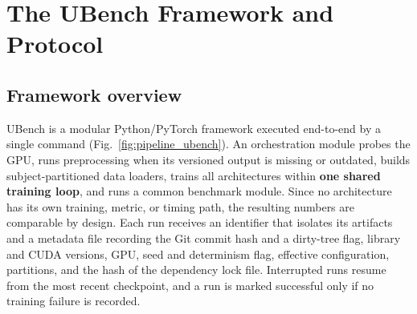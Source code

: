 \section{The UBench Framework and Protocol} \label{sec:metodologia}

\subsection{Framework overview} \label{sec:visao_geral_ubench}

UBench is a modular Python/PyTorch framework executed end-to-end by a single command (Fig.~\ref{fig:pipeline_ubench}).
An orchestration module probes the GPU, runs preprocessing when its versioned output is missing or outdated, builds subject-partitioned data loaders, trains all architectures within \textbf{one shared training loop}, and runs a common benchmark module.
Since no architecture has its own training, metric, or timing path, the resulting numbers are comparable by design.
Each run receives an identifier that isolates its artifacts and a metadata file recording the Git commit hash and a dirty-tree flag, library and CUDA versions, GPU, seed and determinism flag, effective configuration, partitions, and the hash of the dependency lock file.
Interrupted runs resume from the most recent checkpoint, and a run is marked successful only if no training failure is recorded.

